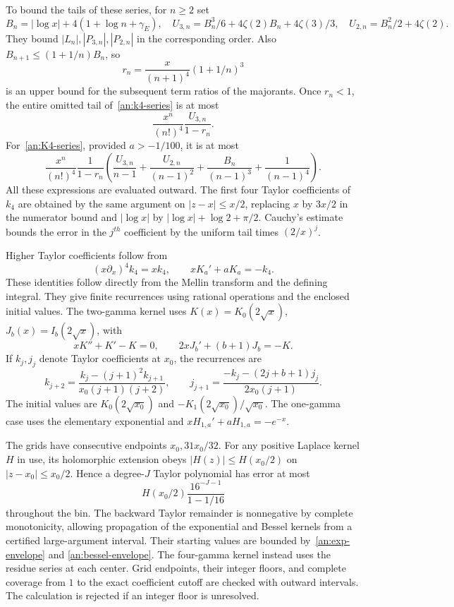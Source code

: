 To bound the tails of these series, for $n\geq2$ set
\[
 B_n=|\log x|+4(1+\log n+\gamma_E),\quad
 U_{3,n}=B_n^3/6+4\zeta(2)B_n+4\zeta(3)/3,
 \quad U_{2,n}=B_n^2/2+4\zeta(2).
\]
They bound $|L_n|,|P_{3,n}|,|P_{2,n}|$ in the corresponding order.
Also $B_{n+1}\leq(1+1/n)B_n$, so
\[
 r_n=\frac{x}{(n+1)^4}(1+1/n)^3
\]
is an upper bound for the subsequent term ratios of the majorants.
Once $r_n<1$, the entire omitted tail of~\eqref{an:k4-series}
is at most
\[
 \frac{x^n}{(n!)^4}\frac{U_{3,n}}{1-r_n}.
\]
For~\eqref{an:K4-series}, provided $a>-1/100$, it is at most
\[
 \frac{x^n}{(n!)^4}\frac1{1-r_n}
 \left(\frac{U_{3,n}}{n-1}+\frac{U_{2,n}}{(n-1)^2}
       +\frac{B_n}{(n-1)^3}+\frac1{(n-1)^4}\right).
\]
All these expressions are evaluated outward. The first four Taylor
coefficients of $k_4$ are obtained by the same argument on
$|z-x|\leq x/2$, replacing $x$ by $3x/2$ in the numerator bound
and $|\log x|$ by $|\log x|+\log2+\pi/2$.
Cauchy's estimate bounds the error in the $j^{th}$ coefficient by
the uniform tail times $(2/x)^j$.

Higher Taylor coefficients follow from
\begin{equation}\label{an:kernel-odes}
 (x\partial_x)^4k_4=xk_4,\qquad xK_a'+aK_a=-k_4.
\end{equation}
These identities follow directly from the Mellin transform and the
defining integral. They give finite recurrences using rational
operations and the enclosed initial values. The two-gamma kernel
uses $K(x)=K_0(2\sqrt x)$, $J_b(x)=I_b(2\sqrt x)$, with
\[
 xK''+K'-K=0,\qquad 2xJ_b'+(b+1)J_b=-K.
\]
If $k_j,j_j$ denote Taylor coefficients at $x_0$, the recurrences are
\[
 k_{j+2}=\frac{k_j-(j+1)^2k_{j+1}}{x_0(j+1)(j+2)},\qquad
 j_{j+1}=\frac{-k_j-(2j+b+1)j_j}{2x_0(j+1)}.
\]
The initial values are $K_0(2\sqrt{x_0})$ and
$-K_1(2\sqrt{x_0})/\sqrt{x_0}$. The one-gamma case uses the elementary
exponential and $xH_{1,a}'+aH_{1,a}=-e^{-x}$.

The grids have consecutive endpoints $x_0,31x_0/32$.
For any positive Laplace kernel $H$ in use, its holomorphic extension
obeys $|H(z)|\leq H(x_0/2)$ on $|z-x_0|\leq x_0/2$.
Hence a degree-$J$ Taylor polynomial has error at most
\begin{equation}\label{an:taylor-error}
 H(x_0/2)\frac{16^{-J-1}}{1-1/16}
\end{equation}
throughout the bin. The backward Taylor remainder is nonnegative by
complete monotonicity, allowing propagation of the exponential and
Bessel kernels from a certified large-argument interval.
Their starting values are bounded by~\eqref{an:exp-envelope} and
\eqref{an:bessel-envelope}. The four-gamma kernel instead uses the
residue series at each center. Grid endpoints, their integer floors,
and complete coverage from $1$ to the exact coefficient cutoff are
checked with outward intervals. The calculation is rejected if an
integer floor is unresolved.


